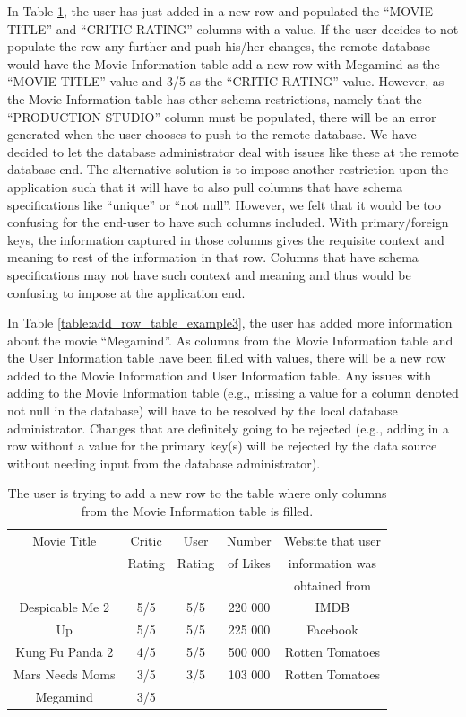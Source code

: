 \documentclass[12pt]{article}
\begin{document}
In Table \ref{table:add_row_table_example2}, the user has just added in a new row and populated the ``MOVIE TITLE'' and ``CRITIC RATING'' columns with a value. If the user decides to not populate the row any further and push his/her changes, the remote database would have the Movie Information table add a new row with Megamind as the ``MOVIE TITLE'' value and 3/5 as the ``CRITIC RATING'' value. However, as the Movie Information table has other schema restrictions, namely that the ``PRODUCTION STUDIO'' column must be populated, there will be an error generated when the user chooses to push to the remote database. We have decided to let the database administrator deal with issues like these at the remote database end. The alternative solution is to impose another restriction upon the application such that it will have to also pull columns that have schema specifications like ``unique'' or ``not null''. However, we felt that it would be too confusing for the end-user to have such columns included. With primary/foreign keys, the information captured in those columns gives the requisite context and meaning to rest of the information in that row. Columns that have schema specifications may not have such context and meaning and thus would be confusing to impose at the application end.

In Table \ref{table:add_row_table_example3}, the user has added more information about the movie ``Megamind''. As columns from the Movie Information table and the User Information table have been filled with values, there will be a new row added to the Movie Information and User Information table. Any issues with adding to the Movie Information table (e.g., missing a value for a column denoted not null in the database) will have to be resolved by the local database administrator. Changes that are definitely going to be rejected (e.g., adding in a row without a value for the primary key(s) will be rejected by the data source without needing input from the database administrator).

\begin{table}[!ht]
\centering
\begin{tabular}{ | c | c | c | c | c | }
 \hline
    Movie Title & Critic  & User & Number & Website that user\\
    & Rating & Rating & of Likes & information was \\
    &&&& obtained from\\ \hline \hline
    Despicable Me 2 & 5/5 & 5/5 & 220 000 & IMDB\\ \hline
    Up & 5/5 & 5/5 & 225 000 & Facebook\\ \hline
    Kung Fu Panda 2 & 4/5 & 5/5 & 500 000 & Rotten Tomatoes\\ \hline
    Mars Needs Moms & 3/5 & 3/5 & 103 000 & Rotten Tomatoes\\ \hline
    Megamind & 3/5 &  &  & \\
    \hline
\end{tabular}
\caption{The user is trying to add a new row to the table where only columns from the Movie Information table is filled.}
\label{table:add_row_table_example2}
\end{table}
\end{document}
